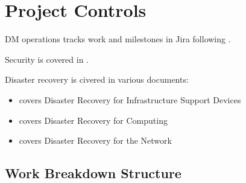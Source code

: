 \section{Project Controls} \label{sec:control}
DM operations tracks work and milestones in Jira following .

Security is covered in \cite{RTN-030}.

Disaster recovery is civered in various documents:

\begin{itemize}
\item {} covers Disaster Recovery for Infrastructure Support Devices
\item {} covers Disaster Recovery for Computing
\item {} covers Disaster Recovery for the  Network
\end{itemize}


\subsection{Work Breakdown Structure} \label{sec:wbs}

